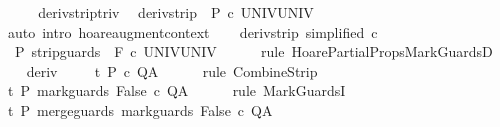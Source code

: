 \begin{isabellebody}
\ {\isacharminus}\isanewline
\ \ \isamarkupfalse%
\ deriv{\isacharunderscore}strip{\isacharunderscore}triv\ \isamarkupfalse%
\ deriv{\isacharunderscore}strip{\isacharcolon}\ {\isachardoublequoteopen}{\isasymGamma}{\isacharcomma}{\isasymTheta}{\isasymturnstile}\isactrlbsub {\isacharslash}{\isacharbraceleft}{\isacharbraceright}\isactrlesub \ P\ c{\isacharprime}{\isacharprime}\ UNIV{\isacharcomma}UNIV{\isachardoublequoteclose}\isanewline
\ \ \ \ \isamarkupfalse%
\ {\isacharparenleft}auto\ intro{\isacharcolon}\ hoare{\isacharunderscore}augment{\isacharunderscore}context{\isacharparenright}\isanewline
\ \ \isamarkupfalse%
\ deriv{\isacharunderscore}strip\ {\isacharbrackleft}simplified\ c{\isacharprime}{\isacharprime}{\isacharbrackright}\isanewline
\ \ \isamarkupfalse%
\ {\isachardoublequoteopen}{\isasymGamma}{\isacharcomma}{\isasymTheta}{\isasymturnstile}\isactrlbsub {\isacharslash}{\isacharbraceleft}{\isacharbraceright}\isactrlesub \ P\ {\isacharparenleft}strip{\isacharunderscore}guards\ {\isacharparenleft}{\isacharminus}\ F{\isacharparenright}\ c{\isacharprime}{\isacharparenright}\ UNIV{\isacharcomma}UNIV{\isachardoublequoteclose}\isanewline
\ \ \ \ \isamarkupfalse%
\ {\isacharparenleft}rule\ HoarePartialProps{\isachardot}MarkGuardsD{\isacharparenright}\isanewline
\ \ \isamarkupfalse%
\ deriv\ \isanewline
\ \ \isamarkupfalse%
\ {\isachardoublequoteopen}{\isasymGamma}{\isacharcomma}{\isasymTheta}{\isasymturnstile}\isactrlsub t\isactrlbsub {\isacharslash}{\isacharbraceleft}{\isacharbraceright}\isactrlesub \ P\ c{\isacharprime}\ Q{\isacharcomma}A{\isachardoublequoteclose}\isanewline
\ \ \ \ \isamarkupfalse%
\ {\isacharparenleft}rule\ CombineStrip{\isacharparenright}\isanewline
\ \ \isamarkupfalse%
\ {\isachardoublequoteopen}{\isasymGamma}{\isacharcomma}{\isasymTheta}{\isasymturnstile}\isactrlsub t\isactrlbsub {\isacharslash}{\isacharbraceleft}{\isacharbraceright}\isactrlesub \ P\ mark{\isacharunderscore}guards\ False\ c{\isacharprime}\ Q{\isacharcomma}A{\isachardoublequoteclose}\isanewline
\ \ \ \ \isamarkupfalse%
\ {\isacharparenleft}rule\ MarkGuardsI{\isacharparenright}\isanewline
\ \ \isamarkupfalse%
\ {\isachardoublequoteopen}{\isasymGamma}{\isacharcomma}{\isasymTheta}{\isasymturnstile}\isactrlsub t\isactrlbsub {\isacharslash}{\isacharbraceleft}{\isacharbraceright}\isactrlesub \ P\ merge{\isacharunderscore}guards\ {\isacharparenleft}mark{\isacharunderscore}guards\ False\ c{\isacharprime}{\isacharparenright}\ Q{\isacharcomma}A{\isachardoublequoteclose}\isanewline

\end{isabellebody}
